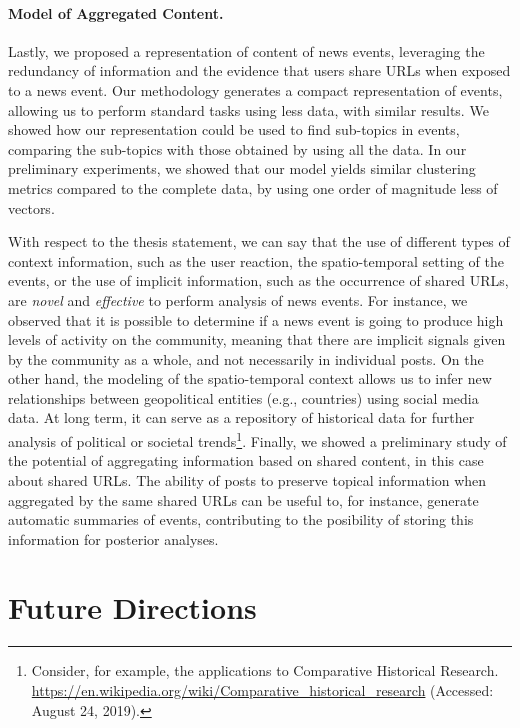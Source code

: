 \paragraph{Model of Aggregated Content.}
%
Lastly, we proposed a representation of content of news events, leveraging the
redundancy of information and the evidence that users share URLs when exposed to
a news event.
%
Our methodology generates a compact representation of events, allowing us to
perform standard tasks using less data, with similar results.
%
We showed how our representation could be used to find sub-topics in events,
comparing the sub-topics with those obtained by using all the data.
%
In our preliminary experiments, we showed that our model yields similar
clustering metrics compared to the complete data, by using one order of
magnitude less of vectors.


With respect to the thesis statement, we can say that the use of different types
of context information, such as the user reaction, the spatio-temporal setting
of the events, or the use of implicit information, such as the occurrence of
shared URLs, are {\em novel} and {\em effective} to perform analysis of news events. 
%
For instance, we observed that it is possible to determine if a news event is
going to produce high levels of activity on the community, meaning that there
are implicit signals given by the community as a whole, and not necessarily in
individual posts.
%
On the other hand, the modeling of the spatio-temporal context allows us to
infer new relationships between geopolitical entities (e.g., countries) using
social media data.
%
At long term, it can serve as a repository of historical data for further
analysis of political or societal trends\footnote{Consider, for example, the
applications to Comparative Historical Research.
\url{https://en.wikipedia.org/wiki/Comparative_historical_research} (Accessed:
August 24, 2019).}.
%
Finally, we showed a preliminary study of the potential of aggregating
information based on shared content, in this case about shared URLs.
%
The ability of posts to preserve topical information when aggregated by the same
shared URLs can be useful to, for instance, generate automatic summaries of
events, contributing to the posibility of storing this information for posterior
analyses.




\section{Future Directions}

